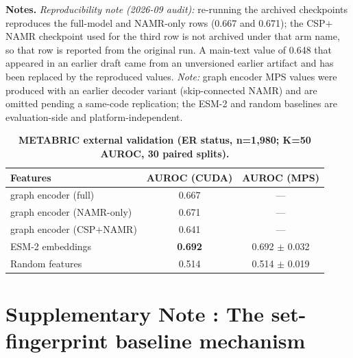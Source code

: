 \documentclass[11pt,a4paper]{article}
\newcounter{suppnote}
\newcommand{\suppnotesection}[2]{\refstepcounter{suppnote}\label{#2}\section*{Supplementary Note \thesuppnote: #1}}
\begin{document}
\begin{table}[H]
\centering
\caption{\textbf{METABRIC external validation (ER status, n=1,980; K=50 AUROC, 30 paired splits).}}

\smallskip
{\footnotesize \noindent \textbf{Notes.} \textit{Reproducibility note (2026-09 audit):} re-running the archived checkpoints reproduces the full-model and NAMR-only rows (0.667 and 0.671); the CSP$+$NAMR checkpoint used for the third row is not archived under that arm name, so that row is reported from the original run. A main-text value of 0.648 that appeared in an earlier draft came from an unversioned earlier artifact and has been replaced by the reproduced values. \textit{Note:} graph encoder MPS values were produced with an earlier decoder variant (skip-connected NAMR) and are omitted pending a same-code replication; the ESM-2 and random baselines are evaluation-side and platform-independent.}

\label{tab:s9}
\footnotesize
\begin{tabular}{@{}lcc@{}}
\toprule
\textbf{Features} & \textbf{AUROC (CUDA)} & \textbf{AUROC (MPS)} \\
\midrule
graph encoder (full) & 0.667 & --- \\
graph encoder (NAMR-only) & 0.671 & --- \\
graph encoder (CSP$+$NAMR) & 0.641 & --- \\
ESM-2 embeddings & \textbf{0.692} & 0.692 $\pm$ 0.032 \\
Random features & 0.514 & 0.514 $\pm$ 0.019 \\
\bottomrule
\end{tabular}
\end{table}

\suppnotesection{The set-fingerprint baseline mechanism}{sec:sn1}
\end{document}
